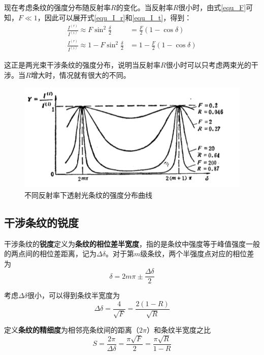\documentclass[UTF8]{ctexart}
\begin{document}
	现在考虑条纹的强度分布随反射率$ R $的变化。当反射率$ R $很小时，由式\ref{equ_F}可知，$ F \ll 1 $，因此可以展开式\ref{equ_I_r}和\ref{equ_I_t}，得到：
	\begin{equation}
	\begin{aligned}
	\frac{I^{(r)}}{I^{(i)}} \approx F \sin ^{2} \frac{\delta}{2}&=\frac{F}{2}(1-\cos \delta)\\
	\frac{I^{(r)}}{I^{(i)}} \approx 1-F \sin ^{2} \frac{\delta}{2}&=1-\frac{F}{2}(1-\cos \delta)
	\end{aligned}
	\end{equation}
	
	这正是两光束干涉条纹的强度分布，说明当反射率$ R $很小时可以只考虑两束光的干涉。当$ R $增大时，情况就有很大的不同。
	\begin{figure}[ht]
		\centering
		\includegraphics[width=12cm]{Interference_R.png}
		\caption{不同反射率下透射光条纹的强度分布曲线}
		\label{figure_R}
	\end{figure}

	\subsection{干涉条纹的锐度}
	干涉条纹的\textbf{锐度}定义为\textbf{条纹的相位差半宽度}，指的是条纹中强度等于峰值强度一般的两点间的相位差距离，记为$ \Delta \delta $。对于第$ m $级条纹，两个半强度点对应的相位差为
	\begin{equation}
		\delta = 2m \pi \pm \frac{\Delta \delta}{2}
	\end{equation}
	
\noindent 考虑$ \Delta \delta $很小，可以得到条纹半宽度为
\begin{equation}
\Delta \delta=\frac{4}{\sqrt{F}}=\frac{2(1-R)}{\sqrt{R}}
\end{equation}

	定义\textbf{条纹的精细度}为相邻亮条纹间的距离（$ 2 \pi $）和条纹半宽度之比
	\begin{equation}
S=\frac{2 \pi}{\Delta \delta}=\frac{\pi \sqrt{F}}{2}=\frac{\pi \sqrt{R}}{1-R}
	\end{equation}
\end{document}
